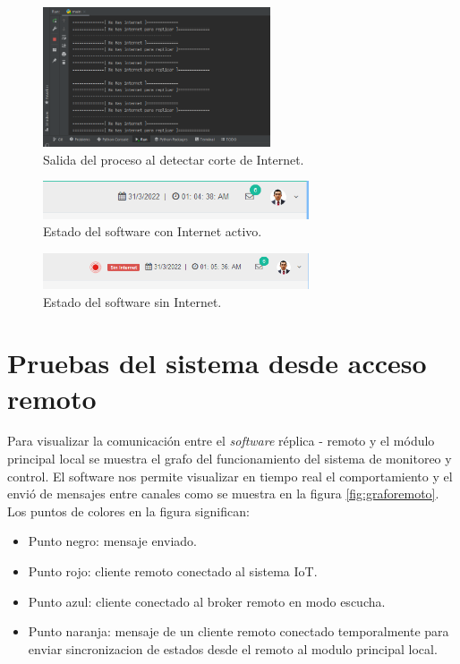 \begin{figure}[htpb]
\centering 
\includegraphics[width=0.6\textwidth]{./Figures/test/replicador/desconexion3.png}
\caption{Salida del proceso al detectar corte de Internet.}
\label{fig:inter1}
\end{figure}
\vspace{0.25cm}
\begin{figure}[htpb]
\centering 
\includegraphics[width=0.7\textwidth]{./Figures/test/replicador/desconexion1.png}
\caption{Estado del software con Internet activo.}
\label{fig:inter2}
\end{figure}
\begin{figure}[htpb]
\centering 
\includegraphics[width=0.7\textwidth]{./Figures/test/replicador/desconexion2.png}
\caption{Estado del software sin Internet.}
\label{fig:inter3}
\end{figure}


\section{Pruebas del sistema desde acceso remoto}

Para visualizar la comunicación entre el \emph{software} réplica - remoto y el módulo principal local se muestra el grafo del funcionamiento del sistema de monitoreo y control. El software nos permite visualizar en tiempo real el comportamiento y el envió de mensajes entre canales como se muestra en la figura \ref{fig:graforemoto}. Los puntos de colores en la figura significan:

\begin{itemize}
\item Punto negro: mensaje enviado.
\item Punto rojo: cliente remoto conectado al sistema IoT.
\item Punto azul: cliente conectado al broker remoto en modo escucha.
\item Punto naranja: mensaje de un cliente remoto conectado temporalmente para enviar sincronizacion de estados desde el remoto al modulo principal local. 
\end{itemize}

